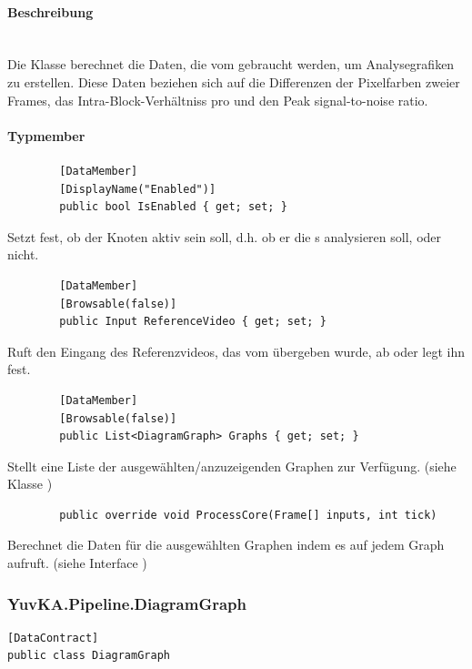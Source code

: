 \paragraph{Beschreibung}~\\
Die Klasse  berechnet die Daten, die vom  gebraucht werden, um Analysegrafiken zu erstellen. Diese Daten beziehen sich auf die Differenzen der Pixelfarben zweier Frames, das Intra-Block-Verhältniss pro  und den Peak signal-to-noise ratio.

\paragraph{Typmember}
\begin{itemize}

	\begin{verbatim}
		[DataMember]
		[DisplayName("Enabled")]
		public bool IsEnabled { get; set; }
	\end{verbatim}
	Setzt fest, ob der Knoten aktiv sein soll, d.h. ob er die s analysieren soll, oder nicht.
	
	\begin{verbatim}
		[DataMember]
		[Browsable(false)]
		public Input ReferenceVideo { get; set; }
	\end{verbatim}
	Ruft den Eingang des Referenzvideos, das vom  übergeben wurde, ab oder legt ihn fest.

	\begin{verbatim}
		[DataMember]
		[Browsable(false)]
		public List<DiagramGraph> Graphs { get; set; }
	\end{verbatim}
	Stellt eine Liste der ausgewählten/anzuzeigenden Graphen zur Verfügung. (siehe Klasse )
	
	\begin{verbatim}
		public override void ProcessCore(Frame[] inputs, int tick)
	\end{verbatim}
	Berechnet die Daten für die ausgewählten Graphen indem es  auf jedem Graph aufruft. (siehe Interface )
	
\end{itemize}

\subsubsection{YuvKA.Pipeline.DiagramGraph}
\begin{verbatim}
[DataContract]
public class DiagramGraph
\end{verbatim}


